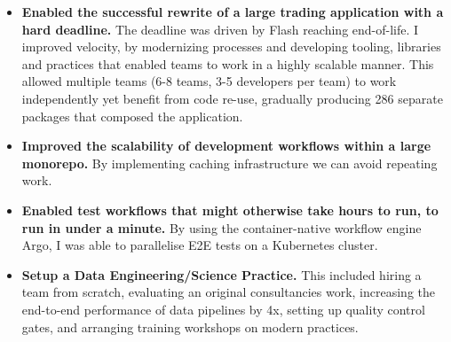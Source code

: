 \documentclass[10pt,a4paper]{article}
\begin{document}
\spacedhrule{1.5em}{-0.4em}


\begin{indentsection}
\item
\begin{itemize}[leftmargin=0cm]

    \item \textbf{Enabled the successful rewrite of a large trading application with a hard deadline.} The deadline was driven by Flash reaching end-of-life. I improved velocity, by modernizing processes and developing tooling, libraries and practices that enabled teams to work in a highly scalable manner. This allowed multiple teams (6-8 teams, 3-5 developers per team) to work independently yet benefit from code re-use, gradually producing 286 separate packages that composed the application.

    \item \textbf{Improved the scalability of development workflows within a large monorepo.} By implementing caching infrastructure we can avoid repeating work.

    \item \textbf{Enabled test workflows that might otherwise take hours to run, to run in under a minute.} By using the container-native workflow engine Argo, I was able to parallelise E2E tests on a Kubernetes cluster.

    \item \textbf{Setup a Data Engineering/Science Practice.} This included hiring a team from scratch, evaluating an original consultancies work, increasing the end-to-end performance of data pipelines by 4x, setting up quality control gates, and arranging training workshops on modern practices.

\end{itemize}
\end{indentsection}

\end{document}
